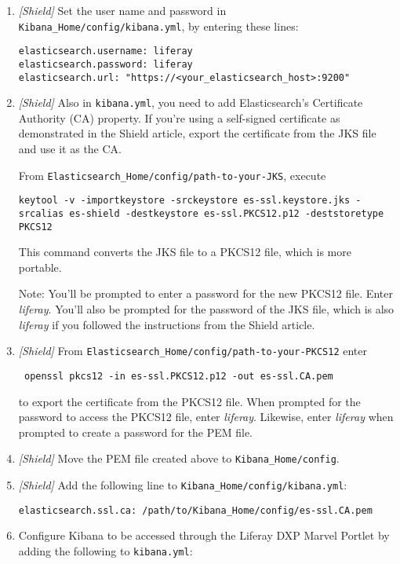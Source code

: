 \begin{enumerate}
\def\labelenumi{\arabic{enumi}.}
\item
  \emph{{[}Shield{]}} Set the user name and password in
  \texttt{Kibana\_Home/config/kibana.yml}, by entering these lines:

\begin{verbatim}
elasticsearch.username: liferay
elasticsearch.password: liferay
elasticsearch.url: "https://<your_elasticsearch_host>:9200"
\end{verbatim}
\item
  \emph{{[}Shield{]}} Also in \texttt{kibana.yml}, you need to add
  Elasticsearch's Certificate Authority (CA) property. If you're using a
  self-signed certificate as demonstrated in the Shield article, export
  the certificate from the JKS file and use it as the CA.

  From \texttt{Elasticsearch\_Home/config/path-to-your-JKS}, execute

\begin{verbatim}
keytool -v -importkeystore -srckeystore es-ssl.keystore.jks -srcalias es-shield -destkeystore es-ssl.PKCS12.p12 -deststoretype PKCS12
\end{verbatim}

  This command converts the JKS file to a PKCS12 file, which is more
  portable.

  Note: You'll be prompted to enter a password for the new PKCS12 file.
  Enter \emph{liferay}. You'll also be prompted for the password of the
  JKS file, which is also \emph{liferay} if you followed the
  instructions from the Shield article.
\item
  \emph{{[}Shield{]}} From
  \texttt{Elasticsearch\_Home/config/path-to-your-PKCS12} enter

\begin{verbatim}
 openssl pkcs12 -in es-ssl.PKCS12.p12 -out es-ssl.CA.pem
\end{verbatim}

  to export the certificate from the PKCS12 file. When prompted for the
  password to access the PKCS12 file, enter \emph{liferay}. Likewise,
  enter \emph{liferay} when prompted to create a password for the PEM
  file.
\item
  \emph{{[}Shield{]}} Move the PEM file created above to
  \texttt{Kibana\_Home/config}.
\item
  \emph{{[}Shield{]}} Add the following line to
  \texttt{Kibana\_Home/config/kibana.yml}:

\begin{verbatim}
elasticsearch.ssl.ca: /path/to/Kibana_Home/config/es-ssl.CA.pem
\end{verbatim}
\item
  Configure Kibana to be accessed through the Liferay DXP Marvel Portlet
  by adding the following to \texttt{kibana.yml}:


\end{enumerate}
